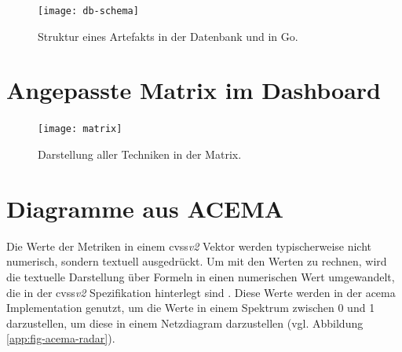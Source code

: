 \begin{figure}[!htb]
    \centering
    \texttt{[image: db-schema]}
    \caption{Struktur eines Artefakts in der Datenbank und in Go.}
\end{figure}

\chapter{Angepasste Matrix im Dashboard}
\label{app:matrix}
\begin{figure}[!htb]
    \centering
    \texttt{[image: matrix]}
    \caption{Darstellung aller Techniken in der Matrix.}
\end{figure}

\chapter{Diagramme aus ACEMA}
\label{app:acema-diagrams}
Die Werte der Metriken in einem \gls{cvss}\textit{v2} Vektor werden typischerweise nicht numerisch, sondern textuell ausgedrückt. Um mit den Werten zu rechnen, wird die textuelle Darstellung über Formeln in einen numerischen Wert umgewandelt, die in der \gls{cvss}\textit{v2} Spezifikation hinterlegt sind \autocite{CVSSV2Complete}. Diese Werte werden in der \gls{acema} Implementation genutzt, um die Werte in einem Spektrum zwischen 0 und 1 darzustellen, um diese in einem Netzdiagram darzustellen (vgl. Abbildung \ref{app:fig-acema-radar}).
